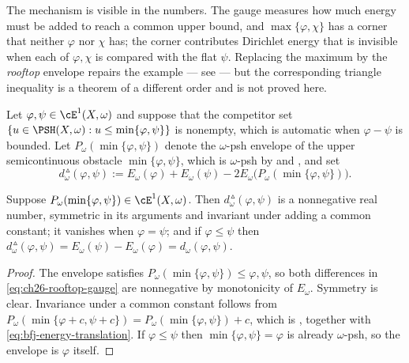 \begin{example}
The mechanism is visible in the numbers.  The gauge measures how much energy
must be added to reach a common upper bound, and $\max\{\varphi,\chi\}$
has a corner that neither $\varphi$ nor $\chi$ has; the corner
contributes Dirichlet energy that is invisible when each of $\varphi,\chi$
is compared with the flat $\psi$.  Replacing the maximum by the
\emph{rooftop} envelope repairs the example --- see
 --- but the corresponding triangle inequality
is a theorem of a different order and is not proved here.
\end{example}

\begin{definition}
\label{def:ch26-rooftop-gauge}
Let $\varphi,\psi\in\cE^1(X,\omega)$ and suppose that the competitor set
$\{u\in\PSH(X,\omega):u\leq\min\{\varphi,\psi\}\}$ is nonempty, which is
automatic when $\varphi-\psi$ is bounded.  Let
$P_\omega(\min\{\varphi,\psi\})$ denote the $\omega$-psh envelope of the
upper semicontinuous obstacle $\min\{\varphi,\psi\}$, which is
$\omega$-psh by  and
, and set
\begin{equation}
\label{eq:ch26-rooftop-gauge}
 d_\omega^{\,\vartriangle}(\varphi,\psi)
 :=E_\omega(\varphi)+E_\omega(\psi)
   -2E_\omega\bigl(P_\omega(\min\{\varphi,\psi\})\bigr).
\end{equation}
\end{definition}

\begin{proposition}
\label{prop:ch26-rooftop-elementary}
Suppose $P_\omega(\min\{\varphi,\psi\})\in\cE^1(X,\omega)$.  Then
$d^{\,\vartriangle}_\omega(\varphi,\psi)$ is a nonnegative real number,
symmetric in its arguments and invariant under adding a common constant; it
vanishes when $\varphi=\psi$; and if $\varphi\leq\psi$ then
$d^{\,\vartriangle}_\omega(\varphi,\psi)=E_\omega(\psi)-E_\omega(\varphi)
=d_\omega(\varphi,\psi)$.
\end{proposition}

\begin{proof}
The envelope satisfies $P_\omega(\min\{\varphi,\psi\})\leq\varphi,\psi$, so
both differences in \eqref{eq:ch26-rooftop-gauge} are nonnegative by
monotonicity of $E_\omega$.  Symmetry is clear.  Invariance under a common
constant follows from
$P_\omega(\min\{\varphi+c,\psi+c\})=P_\omega(\min\{\varphi,\psi\})+c$, which
is , together with
\eqref{eq:bfj-energy-translation}.  If $\varphi\leq\psi$ then
$\min\{\varphi,\psi\}=\varphi$ is already $\omega$-psh, so the envelope is
$\varphi$ itself.
\end{proof}

